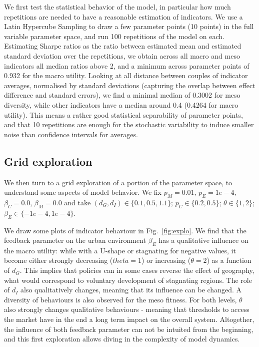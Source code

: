 \documentclass[letterpaper]{article}
\begin{document}

We first test the statistical behavior of the model, in particular how much repetitions are needed to have a reasonable estimation of indicators. We use a Latin Hypercube Sampling to draw a few parameter points (10 points) in the full variable parameter space, and run 100 repetitions of the model on each. Estimating Sharpe ratios as the ratio between estimated mean and estimated standard deviation over the repetitions, we obtain across all macro and meso indicators all median ratios above 2, and a minimum across parameter points of 0.932 for the macro utility. Looking at all distance between couples of indicator averages, normalised by standard deviations (capturing the overlap between effect difference and standard errors), we find a minimal median of 0.3002 for meso diversity, while other indicators have a median around 0.4 (0.4264 for macro utility). This means a rather good statistical separability of parameter points, and that 10 repetitions are enough for the stochastic variability to induce smaller noise than confidence intervals for averages.

\subsection{Grid exploration}


We then turn to a grid exploration of a portion of the parameter space, to understand some aspects of model behavior. We fix $p_M = 0.01$, $p_E=1e-4$, $\beta_C=0.0$, $\beta_M=0.0$ and take $(d_G,d_I)\in \{0.1,0.5,1.1\}$; $p_C \in \{0.2, 0.5\}$; $\theta \in \{1 , 2\}$; $\beta_E \in \{-1e-4 , 1e-4\}$.



We draw some plots of indicator behaviour in Fig.~\ref{fig:explo}. We find that the feedback parameter on the urban environment $\beta_E$ has a qualitative influence on the macro utility: while with a U-shape or stagnating for negative values, it become either strongly decreasing ($theta=1$) or increasing ($\theta=2$) as a function of $d_G$. This implies that policies can in some cases reverse the effect of geography, what would correspond to voluntary development of stagnating regions. The role of $d_I$ also qualitatively changes, meaning that its influence can be changed. A diversity of behaviours is also observed for the meso fitness. For both levels, $\theta$ also strongly changes qualitative behaviours - meaning that thresholds to access the market have in the end a long term impact on the overall system. Altogether, the influence of both feedback parameter can not be intuited from the beginning, and this first exploration allows diving in the complexity of model dynamics.
\end{document}
